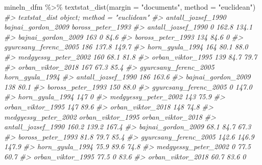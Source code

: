 \documentclass[
]{book}
\newenvironment{Shaded}{\begin{snugshade}}{\end{snugshade}}
\newcommand{\AttributeTok}[1]{\textcolor[rgb]{0.77,0.63,0.00}{#1}}
\newcommand{\CommentTok}[1]{\textcolor[rgb]{0.56,0.35,0.01}{\textit{#1}}}
\newcommand{\FunctionTok}[1]{\textcolor[rgb]{0.00,0.00,0.00}{#1}}
\newcommand{\NormalTok}[1]{#1}
\newcommand{\SpecialCharTok}[1]{\textcolor[rgb]{0.00,0.00,0.00}{#1}}
\newcommand{\StringTok}[1]{\textcolor[rgb]{0.31,0.60,0.02}{#1}}
\begin{document}
\begin{Shaded}
\begin{Highlighting}[]
\NormalTok{mineln\_dfm }\SpecialCharTok{\%\textgreater{}\%}
  \FunctionTok{textstat\_dist}\NormalTok{(}\AttributeTok{margin =} \StringTok{"documents"}\NormalTok{, }\AttributeTok{method =} \StringTok{"euclidean"}\NormalTok{)}
\CommentTok{\#\textgreater{} textstat\_dist object; method = "euclidean"}
\CommentTok{\#\textgreater{}                       antall\_jozsef\_1990 bajnai\_gordon\_2009 boross\_peter\_1993}
\CommentTok{\#\textgreater{} antall\_jozsef\_1990                     0              162.8             134.1}
\CommentTok{\#\textgreater{} bajnai\_gordon\_2009                   163                  0              84.6}
\CommentTok{\#\textgreater{} boross\_peter\_1993                    134               84.6                 0}
\CommentTok{\#\textgreater{} gyurcsany\_ferenc\_2005                186              137.8             149.7}
\CommentTok{\#\textgreater{} horn\_gyula\_1994                      164               80.1              88.0}
\CommentTok{\#\textgreater{} medgyessy\_peter\_2002                 160               68.1              81.8}
\CommentTok{\#\textgreater{} orban\_viktor\_1995                    139               84.7              79.7}
\CommentTok{\#\textgreater{} orban\_viktor\_2018                    167               67.3              85.4}
\CommentTok{\#\textgreater{}                       gyurcsany\_ferenc\_2005 horn\_gyula\_1994}
\CommentTok{\#\textgreater{} antall\_jozsef\_1990                      186           163.6}
\CommentTok{\#\textgreater{} bajnai\_gordon\_2009                      138            80.1}
\CommentTok{\#\textgreater{} boross\_peter\_1993                       150            88.0}
\CommentTok{\#\textgreater{} gyurcsany\_ferenc\_2005                     0           147.0}
\CommentTok{\#\textgreater{} horn\_gyula\_1994                         147               0}
\CommentTok{\#\textgreater{} medgyessy\_peter\_2002                    143            75.9}
\CommentTok{\#\textgreater{} orban\_viktor\_1995                       147            89.6}
\CommentTok{\#\textgreater{} orban\_viktor\_2018                       148            74.8}
\CommentTok{\#\textgreater{}                       medgyessy\_peter\_2002 orban\_viktor\_1995 orban\_viktor\_2018}
\CommentTok{\#\textgreater{} antall\_jozsef\_1990                   160.2             139.2             167.4}
\CommentTok{\#\textgreater{} bajnai\_gordon\_2009                    68.1              84.7              67.3}
\CommentTok{\#\textgreater{} boross\_peter\_1993                     81.8              79.7              85.4}
\CommentTok{\#\textgreater{} gyurcsany\_ferenc\_2005                142.6             146.9             147.9}
\CommentTok{\#\textgreater{} horn\_gyula\_1994                       75.9              89.6              74.8}
\CommentTok{\#\textgreater{} medgyessy\_peter\_2002                     0              77.5              60.7}
\CommentTok{\#\textgreater{} orban\_viktor\_1995                     77.5                 0              83.6}
\CommentTok{\#\textgreater{} orban\_viktor\_2018                     60.7              83.6                 0}
\end{Highlighting}
\end{Shaded}
\end{document}
